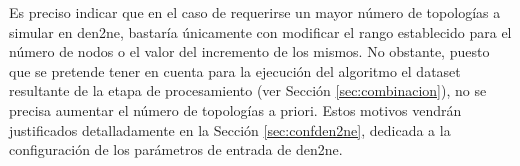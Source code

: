 \vspace{3mm}

Es preciso indicar que en el caso de requerirse un mayor número de topologías a simular en \gls{den2ne}, bastaría únicamente con modificar el rango establecido para el número de nodos o el valor del incremento de los mismos. No obstante, puesto que se pretende tener en cuenta para la ejecución del algoritmo el dataset resultante de la etapa de procesamiento (ver Sección \ref{sec:combinacion}), no se precisa aumentar el número de topologías a priori. Estos motivos vendrán justificados detalladamente en la Sección \ref{sec:confden2ne}, dedicada a la configuración de los parámetros de entrada de \gls{den2ne}.

